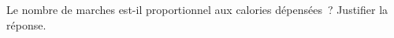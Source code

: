 \documentclass[exercice]{thedocument}%
\begin{document}
%
Le nombre de marches est-il proportionnel aux calories dépensées~? Justifier la réponse.\vskip10pt
\end{document}
